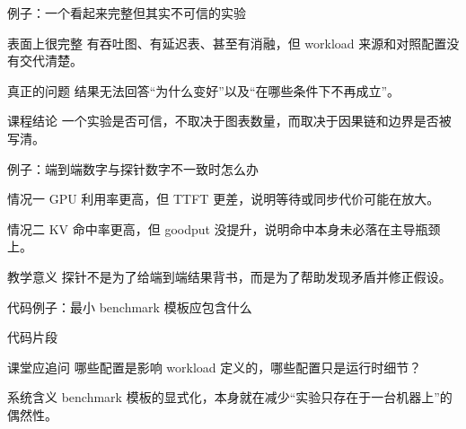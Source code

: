 \begin{frame}{例子：一个看起来完整但其实不可信的实验}
  \begin{block}{表面上很完整}
    有吞吐图、有延迟表、甚至有消融，但 workload 来源和对照配置没有交代清楚。
  \end{block}
  \pause
  \begin{block}{真正的问题}
    结果无法回答“为什么变好”以及“在哪些条件下不再成立”。
  \end{block}
  \pause
  \begin{block}{课程结论}
    一个实验是否可信，不取决于图表数量，而取决于因果链和边界是否被写清。
  \end{block}
\end{frame}

\begin{frame}{例子：端到端数字与探针数字不一致时怎么办}
  \begin{block}{情况一}
    GPU 利用率更高，但 TTFT 更差，说明等待或同步代价可能在放大。
  \end{block}
  \pause
  \begin{block}{情况二}
    KV 命中率更高，但 goodput 没提升，说明命中本身未必落在主导瓶颈上。
  \end{block}
  \pause
  \begin{block}{教学意义}
    探针不是为了给端到端结果背书，而是为了帮助发现矛盾并修正假设。
  \end{block}
\end{frame}

\begin{frame}{代码例子：最小 benchmark 模板应包含什么}
  \begin{block}{代码片段}
    {\ttfamily\small
    \par
    \par
    \par
    \par
    }
  \end{block}
  \pause
  \begin{block}{课堂应追问}
    哪些配置是影响 workload 定义的，哪些配置只是运行时细节？
  \end{block}
  \pause
  \begin{block}{系统含义}
    benchmark 模板的显式化，本身就在减少“实验只存在于一台机器上”的偶然性。
  \end{block}
\end{frame}

